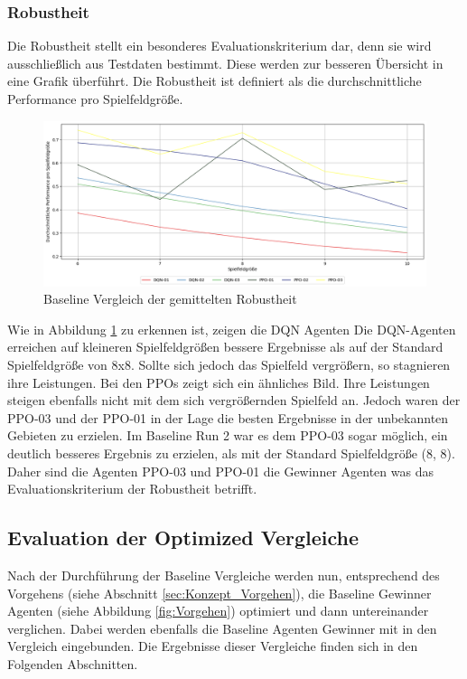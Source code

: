 \subsubsection{Robustheit}
Die Robustheit stellt ein besonderes Evaluationskriterium dar, denn sie wird ausschließlich aus Testdaten bestimmt. Diese werden zur besseren Übersicht in eine Grafik überführt. Die Robustheit ist definiert als die durchschnittliche Performance pro Spielfeldgröße.
\begin{figure}[H]
	\centering
	\includegraphics[scale=0.4517]{Abbildungen/Evaluation/baseline-robustheit.png}
	\caption[Baseline Vergleich Robustheit]{Baseline Vergleich der gemittelten Robustheit}
	\label{fig:Evaluation_Baseline_Robustheit}
\end{figure}
Wie in Abbildung \ref{fig:Evaluation_Baseline_Robustheit} zu erkennen ist, zeigen die DQN Agenten 
Die DQN-Agenten erreichen auf kleineren Spielfeldgrößen bessere Ergebnisse als auf der Standard Spielfeldgröße von 8x8. Sollte sich jedoch das Spielfeld vergrößern, so stagnieren ihre Leistungen.
Bei den PPOs zeigt sich ein ähnliches Bild. Ihre Leistungen steigen ebenfalls nicht mit dem sich vergrößernden Spielfeld an. Jedoch waren der PPO-03 und der PPO-01 in der Lage die besten Ergebnisse in der unbekannten Gebieten zu erzielen. Im Baseline Run 2 war es dem PPO-03 sogar möglich, ein deutlich besseres Ergebnis zu erzielen, als mit der Standard Spielfeldgröße (8, 8).\\
Daher sind die Agenten PPO-03 und PPO-01 die Gewinner Agenten was das Evaluationskriterium der Robustheit betrifft.

\subsection{Evaluation der Optimized Vergleiche}
Nach der Durchführung der Baseline Vergleiche werden nun, entsprechend des Vorgehens (siehe Abschnitt \ref{sec:Konzept_Vorgehen}), die Baseline Gewinner Agenten (siehe Abbildung \ref{fig:Vorgehen}) optimiert und dann untereinander verglichen. Dabei werden ebenfalls die Baseline Agenten Gewinner mit in den Vergleich eingebunden. Die Ergebnisse dieser Vergleiche finden sich in den Folgenden Abschnitten.

